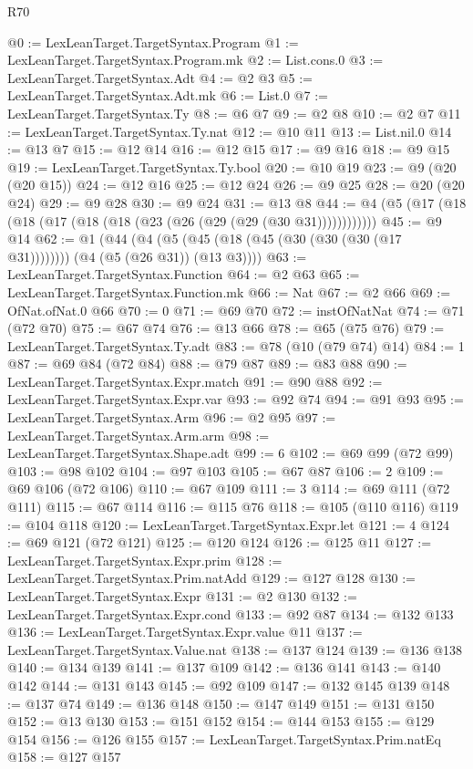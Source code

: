 \begin{lexlean}{R70}
\begin{coremodule}
@0 := LexLeanTarget.TargetSyntax.Program
@1 := LexLeanTarget.TargetSyntax.Program.mk
@2 := List.cons.{0}
@3 := LexLeanTarget.TargetSyntax.Adt
@4 := @2 @3
@5 := LexLeanTarget.TargetSyntax.Adt.mk
@6 := List.{0}
@7 := LexLeanTarget.TargetSyntax.Ty
@8 := @6 @7
@9 := @2 @8
@10 := @2 @7
@11 := LexLeanTarget.TargetSyntax.Ty.nat
@12 := @10 @11
@13 := List.nil.{0}
@14 := @13 @7
@15 := @12 @14
@16 := @12 @15
@17 := @9 @16
@18 := @9 @15
@19 := LexLeanTarget.TargetSyntax.Ty.bool
@20 := @10 @19
@23 := @9 (@20 (@20 @15))
@24 := @12 @16
@25 := @12 @24
@26 := @9 @25
@28 := @20 (@20 @24)
@29 := @9 @28
@30 := @9 @24
@31 := @13 @8
@44 := @4 (@5 (@17 (@18 (@18 (@17 (@18 (@18 (@23 (@26 (@29 (@29 (@30 @31))))))))))))
@45 := @9 @14
@62 := @1 (@44 (@4 (@5 (@45 (@18 (@45 (@30 (@30 (@30 (@17 @31)))))))) (@4 (@5 (@26 @31)) (@13 @3))))
@63 := LexLeanTarget.TargetSyntax.Function
@64 := @2 @63
@65 := LexLeanTarget.TargetSyntax.Function.mk
@66 := Nat
@67 := @2 @66
@69 := OfNat.ofNat.{0} @66
@70 := 0
@71 := @69 @70
@72 := instOfNatNat
@74 := @71 (@72 @70)
@75 := @67 @74
@76 := @13 @66
@78 := @65 (@75 @76)
@79 := LexLeanTarget.TargetSyntax.Ty.adt
@83 := @78 (@10 (@79 @74) @14)
@84 := 1
@87 := @69 @84 (@72 @84)
@88 := @79 @87
@89 := @83 @88
@90 := LexLeanTarget.TargetSyntax.Expr.match
@91 := @90 @88
@92 := LexLeanTarget.TargetSyntax.Expr.var
@93 := @92 @74
@94 := @91 @93
@95 := LexLeanTarget.TargetSyntax.Arm
@96 := @2 @95
@97 := LexLeanTarget.TargetSyntax.Arm.arm
@98 := LexLeanTarget.TargetSyntax.Shape.adt
@99 := 6
@102 := @69 @99 (@72 @99)
@103 := @98 @102
@104 := @97 @103
@105 := @67 @87
@106 := 2
@109 := @69 @106 (@72 @106)
@110 := @67 @109
@111 := 3
@114 := @69 @111 (@72 @111)
@115 := @67 @114
@116 := @115 @76
@118 := @105 (@110 @116)
@119 := @104 @118
@120 := LexLeanTarget.TargetSyntax.Expr.let
@121 := 4
@124 := @69 @121 (@72 @121)
@125 := @120 @124
@126 := @125 @11
@127 := LexLeanTarget.TargetSyntax.Expr.prim
@128 := LexLeanTarget.TargetSyntax.Prim.natAdd
@129 := @127 @128
@130 := LexLeanTarget.TargetSyntax.Expr
@131 := @2 @130
@132 := LexLeanTarget.TargetSyntax.Expr.cond
@133 := @92 @87
@134 := @132 @133
@136 := LexLeanTarget.TargetSyntax.Expr.value @11
@137 := LexLeanTarget.TargetSyntax.Value.nat
@138 := @137 @124
@139 := @136 @138
@140 := @134 @139
@141 := @137 @109
@142 := @136 @141
@143 := @140 @142
@144 := @131 @143
@145 := @92 @109
@147 := @132 @145 @139
@148 := @137 @74
@149 := @136 @148
@150 := @147 @149
@151 := @131 @150
@152 := @13 @130
@153 := @151 @152
@154 := @144 @153
@155 := @129 @154
@156 := @126 @155
@157 := LexLeanTarget.TargetSyntax.Prim.natEq
@158 := @127 @157

\end{coremodule}
\end{lexlean}
